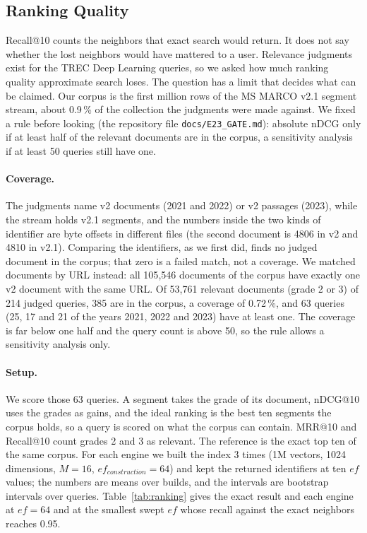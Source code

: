 \documentclass[sigconf, nonacm]{acmart}
\begin{document}
\subsection{Ranking Quality}
\label{sec:ranking}

Recall@10 counts the neighbors that exact search would return. It does not say whether the lost neighbors would have
mattered to a user. Relevance judgments exist for the TREC Deep Learning queries, so we asked how much ranking quality
approximate search loses. The question has a limit that decides what can be claimed. Our corpus is the first million
rows of the MS MARCO v2.1 segment stream, about 0.9\,\% of the collection the judgments were made against. We fixed a
rule before looking (the repository file \texttt{docs/E23\_GATE.md}): absolute nDCG only if at least half of the
relevant documents are in the corpus, a sensitivity analysis if at least 50 queries still have one.

\paragraph{Coverage.} The judgments name v2 documents (2021 and 2022) or v2 passages (2023), while the stream
holds v2.1 segments, and the numbers inside the two kinds of identifier are byte offsets in different files (the second
document is 4806 in v2 and 4810 in v2.1). Comparing the identifiers, as we first did, finds no judged document
in the corpus; that zero is a failed match, not a coverage. We matched documents by URL instead: all 105{,}546 documents of the corpus
have exactly one v2 document with the same URL. Of 53{,}761 relevant documents (grade 2 or 3) of 214 judged queries, 385 are in
the corpus, a coverage of 0.72\,\%, and 63 queries (25, 17 and 21 of the years 2021, 2022 and 2023) have at least one. The
coverage is far below one half and the query count is above 50, so the rule allows a sensitivity analysis only.

\paragraph{Setup.} We score those 63 queries. A segment takes the grade of its document, nDCG@10 uses the grades
as gains, and the ideal ranking is the best ten segments the corpus holds, so a query is scored on what the corpus can
contain. MRR@10 and Recall@10 count grades 2 and 3 as relevant. The reference is the exact top ten of the same corpus.
For each engine we built the index 3 times (1M vectors, 1024 dimensions, $M=16$, $ef_{construction}=64$) and kept the
returned identifiers at ten $ef$ values; the numbers are means over builds, and the intervals are bootstrap intervals over
queries. Table~\ref{tab:ranking} gives the exact result and each engine at $ef=64$ and at the smallest swept $ef$ whose
recall against the exact neighbors reaches 0.95.
\end{document}
